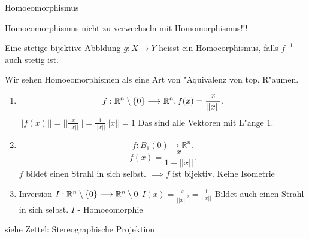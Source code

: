 \documentclass[class=article, crop=false]{standalone}
\begin{document}
\begin{zettel}{Homoeomorphismus}
\begin{flashcard}[fgdi77if]{Homoeomorphismus}
	nicht zu verwechseln mit Homomorphismus!!!
	\begin{definition}[Homoeomorphismus]
		Eine stetige bijektive Abbldung $g:X \longrightarrow Y$  heisst ein Homoeorphismus, falls $f^{-1} $  auch stetig ist.
		\begin{remark}
			Wir sehen Homoeomorphismen als eine Art von "Aquivalenz von top. R"aumen.
		\end{remark}
	\end{definition}

	\begin{example}
		\begin{enumerate}
			\item \[
				      f: \mathbb{R}^n \setminus \set{0} \longrightarrow  \mathbb{R}^n , f(x) =  \frac{x}{ ||x||}
			      .\]
			      $ ||f(x)|| = ||\frac{x}{||x||}|| = \frac{1}{ ||x||} ||x|| = 1 $
			      Das sind alle Vektoren mit L"ange 1.
			\item \[
				      f: B_1 (0) \longrightarrow \mathbb{R}^n
			      .\]
			      \[
				      f(x) =  \frac{x}{1 - ||x||}
			      .\]
			      $f$ bildet einen Strahl in sich selbst. $\implies f$ ist bijektiv. Keine Isometrie

			\item Inversion $I: \mathbb{R}^n \setminus \set{0} \longrightarrow  \R^n \setminus 0$  \quad $I(x) = \frac{x}{ ||x||^2 } = \frac{1}{ ||x||}  $ Bildet auch einen Strahl in sich selbst. $I$ - Homoeomorphie
		\end{enumerate}
	\end{example}

	\begin{example}
		siehe Zettel: Stereographische Projektion
	\end{example}

\end{flashcard}
\end{zettel}
\end{document}
